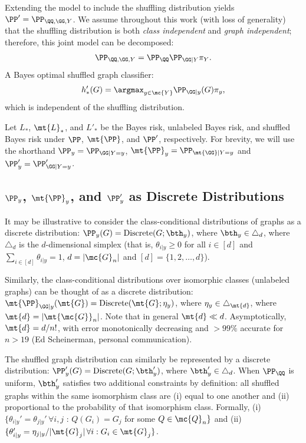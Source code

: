 \documentclass[10pt,journal,cspaper,compsoc]{IEEEtran}
\newcommand{\Qs}{Q}
\begin{document}
Extending the model to include the shuffling distribution yields $\PP'=\PP_{\QQ,\GG,Y}$.  We assume throughout this work (with loss of generality) that the shuffling distribution is both \emph{class independent} and \emph{graph independent}; therefore, this joint model can be decomposed:
\begin{align}
	\PP_{\QQ,\GG,Y} = \PP_{\QQ} \PP_{\GG |Y} \pi_Y.
\end{align}
A Bayes optimal shuffled graph classifier:
\begin{align}
	h'_*(G)=\argmax_{y\in\mc{Y}}\PP_{\GG|y}(G)\pi_y,
\end{align}
which is independent of the shuffling distribution.

Let $L_*$, $\mt{L}_*$, and $L'_*$ be the Bayes risk, unlabeled Bayes risk, and shuffled Bayes risk under $\PP$, $\mt{\PP}$, and $\PP'$, respectively.  For brevity, we will use the shorthand $\PP_y=\PP_{\GG | Y = y}$, $\mt{\PP}_y=\PP_{\mt{\GG} | Y = y}$ and $\PP'_y=\PP_{\GG|Y=y}'$. 



\subsection{$\PP_y$, $\mt{\PP}_y$, and $\PP_y'$ as Discrete Distributions} %
\label{sub:_pp_pp_and_pp_are_discrete_distributions}




It may be illustrative to consider the class-conditional distributions of graphs as a discrete distribution: $\PP_y(G)=\text{Discrete}(G; \bth_y)$, where $\bth_y \in \triangle_d$, where $\triangle_d$ is the $d$-dimensional simplex (that is, $\theta_{i|y}\geq 0$ for all $i \in [d]$ and $\sum_{i \in [d]} \theta_{i|y}=1$, $d=|\mc{G}_n|$ and $[d]=\{1,2,\ldots,d\}$). 

Similarly, the class-conditional distributions over isomorphic classes (unlabeled graphs) can be thought of as a discrete distribution: $\mt{\PP}_{\GG | y}(\mt{G})=\text{Discrete}(\mt{G}; \eta_y)$, where $\eta_{y}\in \triangle_{\mt{d}}$, where  $\mt{d}=|\mt{\mc{G}}_n|$.  Note that in general $\mt{d} \ll d$. Asymptotically, $\mt{d}=d/n!$, with error monotonically decreasing and $>99\%$ accurate for $n>19$ (Ed Scheinerman, personal communication).

The shuffled graph distribution can similarly be represented by a discrete distribution: $\PP'_y(G)=\text{Discrete}(G; \bth_y')$, where $\bth_y' \in \triangle_d$.  When $\PP_{\QQ}$ is uniform, $\bth_y'$ satisfies two additional constraints by definition: all shuffled graphs within the same isomorphism class are (i) equal to one another and (ii) proportional to the probability of that isomorphism class.  Formally, (i) $\{\theta_{i|y}' = \theta_{j|y}' \, \forall i,j$ : $\Qs(G_i)=G_j$ for some $\Qs \in \mc{Q}_n\}$ and  (ii) $\{\theta_{i|y}'=\eta_{j|y}/|\mt{G}_j| \, \forall i : G_i \in \mt{G}_j\}$.  
\end{document}
